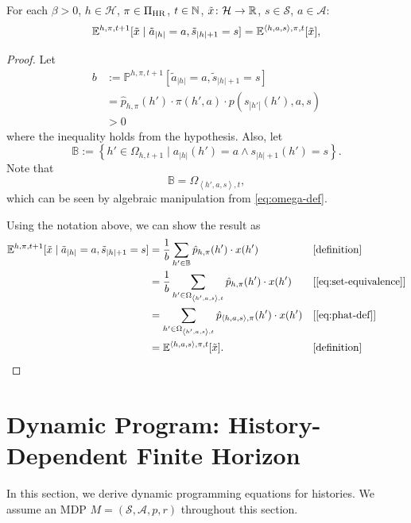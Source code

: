 \begin{theorem} \label{thm:exph-cond-eq-hist}
For each $\beta >0$, $h\in \mathcal{H}$, $\pi\in \Pi_{\mathrm{HR}}$, $t\in \mathbb{N}$, $\tilde{x}\colon \mathcal{H} \to \mathbb{R}$, $s\in \mathcal{S}$, $a\in \mathcal{A}$:
\[
  \mathbb{E}^{h,\pi,t+1}[\tilde{x} \mid \tilde{a}_{|h|} = a, \tilde{s}_{|h|+1} = s]
  =
  \mathbb{E}^{\langle h, a, s\rangle,\pi,t}[\tilde{x}],
\]
\end{theorem}
\begin{proof}
  Let
  \[
    \begin{aligned}
      b &:= \mathbb{P}^{h,\pi,t+1} \left[ \tilde{a}_{|h|} = a, \tilde{s}_{|h|+1} = s \right] \\
      &= \hat{p}_{h,\pi}(h') \cdot  \pi(h', a) \cdot p(s_{|h'|}(h'), a, s) \\
       &> 0
    \end{aligned}
  \]
  where the inequality holds from the hypothesis. Also, let
  \[
    \mathbb{B} := \left\{ h'\in \Omega_{h,t+1} \mid a_{|h|}(h') = a \wedge s_{|h|+1}(h') = s\right\}.
  \]
  Note that
  \begin{equation} \label{eq:set-equivalence}
    \mathbb{B} = \Omega_{\left< h', a, s \right>, t},
\end{equation}
  which can be seen by algebraic manipulation from \eqref{eq:omega-def}.

  Using the notation above, we can show the result as
  \begin{align*}
  \E^{h,\pi,t+1}[\tilde{x} \mid \tilde{a}_{|h|} = a, \tilde{s}_{|h|+1} = s]
  &= \frac{1}{b} \sum_{h'\in \mathbb{B}} \hat{p}_{h,\pi}(h') \cdot x(h')
  && \why{definition}\\
  &= \frac{1}{b} \sum_{h'\in \Omega_{\left< h', a, s \right>, t}} \hat{p}_{h,\pi}(h') \cdot x(h')
  && \why{\cref{eq:set-equivalence}} \\
  &= \sum_{h'\in \Omega_{\left< h', a, s \right>, t}} \hat{p}_{\left<h, a,s  \right>,\pi}(h') \cdot x(h')
  && \why{\cref{eq:phat-def}} \\
  &= \E^{\langle h, a, s\rangle,\pi,t}[\tilde{x}]. && \why{definition}
  \end{align*}
\end{proof}

\section{Dynamic Program: History-Dependent Finite Horizon}

In this section, we derive dynamic programming equations for histories. We assume an MDP $M = (\mathcal{S}, \mathcal{A}, p, r)$ throughout this section.

